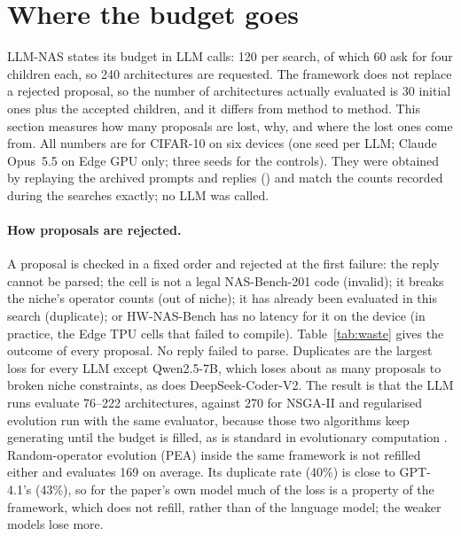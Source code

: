 \section{Where the budget goes}\label{sec:budget}
\noindent LLM-NAS states its budget in LLM calls: 120 per search, of which 60 ask for four children each, so 240 architectures are requested. The framework does not replace a rejected proposal, so the number of architectures actually evaluated is 30 initial ones plus the accepted children, and it differs from method to method. This section measures how many proposals are lost, why, and where the lost ones come from. All numbers are for CIFAR-10 on six devices (one seed per LLM; Claude Opus~5.5 on Edge GPU only; three seeds for the controls). They were obtained by replaying the archived prompts and replies () and match the counts recorded during the searches exactly; no LLM was called.

\paragraph{How proposals are rejected.} A proposal is checked in a fixed order and rejected at the first failure: the reply cannot be parsed; the cell is not a legal NAS-Bench-201 code (invalid); it breaks the niche's operator counts (out of niche); it has already been evaluated in this search (duplicate); or HW-NAS-Bench has no latency for it on the device (in practice, the Edge TPU cells that failed to compile). Table~\ref{tab:waste} gives the outcome of every proposal. No reply failed to parse. Duplicates are the largest loss for every LLM except Qwen2.5-7B, which loses about as many proposals to broken niche constraints, as does DeepSeek-Coder-V2. The result is that the LLM runs evaluate 76--222 architectures, against 270 for NSGA-II \cite{deb02} and regularised evolution \cite{real19} run with the same evaluator, because those two algorithms keep generating until the budget is filled, as is standard in evolutionary computation \cite{mauldin84}. Random-operator evolution (PEA) inside the same framework is not refilled either and evaluates 169 on average. Its duplicate rate (40\%) is close to GPT-4.1's (43\%), so for the paper's own model much of the loss is a property of the framework, which does not refill, rather than of the language model; the weaker models lose more.

